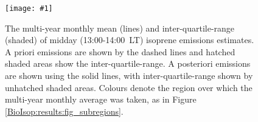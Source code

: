 \documentclass[acp, manuscript]{copernicus}
\newcommand{\mypic}[3]{%
  \begin{figure}
    \texttt{[image: \#1]}
    \caption{#2}
    #3
  \end{figure}
}
\begin{document}
    
    
    \mypic{Figures/Emiss/E_zones_multiyear_PP_lr.png}{ %
      The multi-year monthly mean (lines) and inter-quartile-range (shaded) of midday (13:00-14:00~LT) isoprene emissions estimates. 
      A priori emissions are shown by the dashed lines and hatched shaded areas show the inter-quartile-range.
      A posteriori emissions are shown using the solid lines, with inter-quartile-range shown by unhatched shaded areas.
      Colours denote the region over which the multi-year monthly average was taken, as in Figure \ref{BioIsop:results:fig_subregions}.
    }{\label{BioIsop:results:emissions:fig_megan_vs_Enew_regional_mya}}
    
    
    
\end{document}

